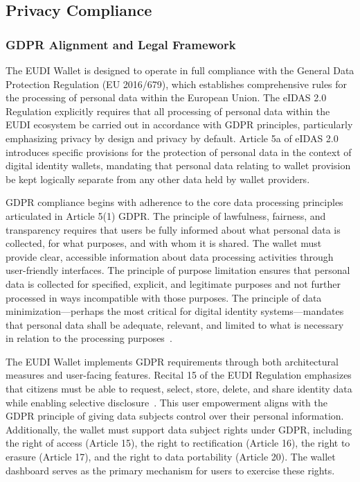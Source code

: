 \documentclass[sigconf,balance,nonacm,authordraft]{acmart}
\begin{document}
\subsection{Privacy Compliance}

\subsubsection{GDPR Alignment and Legal Framework}

The EUDI Wallet is designed to operate in full compliance with the General Data Protection Regulation (EU 2016/679), which establishes comprehensive rules for the processing of personal data within the European Union. The eIDAS 2.0 Regulation explicitly requires that all processing of personal data within the EUDI ecosystem be carried out in accordance with GDPR principles, particularly emphasizing privacy by design and privacy by default. Article 5a of eIDAS 2.0 introduces specific provisions for the protection of personal data in the context of digital identity wallets, mandating that personal data relating to wallet provision be kept logically separate from any other data held by wallet providers.

GDPR compliance begins with adherence to the core data processing principles articulated in Article 5(1) GDPR. The principle of lawfulness, fairness, and transparency requires that users be fully informed about what personal data is collected, for what purposes, and with whom it is shared. The wallet must provide clear, accessible information about data processing activities through user-friendly interfaces. The principle of purpose limitation ensures that personal data is collected for specified, explicit, and legitimate purposes and not further processed in ways incompatible with those purposes. The principle of data minimization—perhaps the most critical for digital identity systems—mandates that personal data shall be adequate, relevant, and limited to what is necessary in relation to the processing purposes~\cite{ZKPDiscussion_Recital15}.

The EUDI Wallet implements GDPR requirements through both architectural measures and user-facing features. Recital 15 of the EUDI Regulation emphasizes that citizens must be able to request, select, store, delete, and share identity data while enabling selective disclosure~\cite{ZKPDiscussion_Recital15}. This user empowerment aligns with the GDPR principle of giving data subjects control over their personal information. Additionally, the wallet must support data subject rights under GDPR, including the right of access (Article 15), the right to rectification (Article 16), the right to erasure (Article 17), and the right to data portability (Article 20). The wallet dashboard serves as the primary mechanism for users to exercise these rights.
\end{document}
